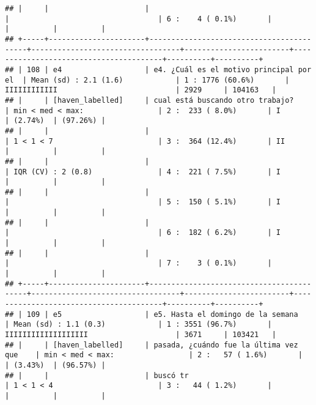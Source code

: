 \documentclass[]{article}
\begin{document}
\begin{verbatim}
## |     |                      |                                          |                                  | 6 :    4 ( 0.1%)       |                                        |          |          |
## +-----+----------------------+------------------------------------------+----------------------------------+------------------------+----------------------------------------+----------+----------+
## | 108 | e4                   | e4. ¿Cuál es el motivo principal por el  | Mean (sd) : 2.1 (1.6)            | 1 : 1776 (60.6%)       | IIIIIIIIIIII                           | 2929     | 104163   |
## |     | [haven_labelled]     | cual está buscando otro trabajo?         | min < med < max:                 | 2 :  233 ( 8.0%)       | I                                      | (2.74%)  | (97.26%) |
## |     |                      |                                          | 1 < 1 < 7                        | 3 :  364 (12.4%)       | II                                     |          |          |
## |     |                      |                                          | IQR (CV) : 2 (0.8)               | 4 :  221 ( 7.5%)       | I                                      |          |          |
## |     |                      |                                          |                                  | 5 :  150 ( 5.1%)       | I                                      |          |          |
## |     |                      |                                          |                                  | 6 :  182 ( 6.2%)       | I                                      |          |          |
## |     |                      |                                          |                                  | 7 :    3 ( 0.1%)       |                                        |          |          |
## +-----+----------------------+------------------------------------------+----------------------------------+------------------------+----------------------------------------+----------+----------+
## | 109 | e5                   | e5. Hasta el domingo de la semana        | Mean (sd) : 1.1 (0.3)            | 1 : 3551 (96.7%)       | IIIIIIIIIIIIIIIIIII                    | 3671     | 103421   |
## |     | [haven_labelled]     | pasada, ¿cuándo fue la última vez que    | min < med < max:                 | 2 :   57 ( 1.6%)       |                                        | (3.43%)  | (96.57%) |
## |     |                      | buscó tr                                 | 1 < 1 < 4                        | 3 :   44 ( 1.2%)       |                                        |          |          |

\end{verbatim}
\end{document}
